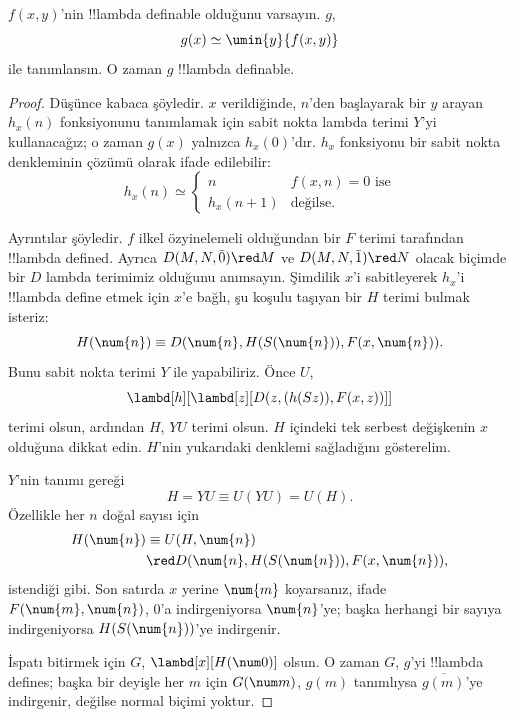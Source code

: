 


\begin{lem}
$f(x,y)$'nin !!{lambda definable} olduğunu varsayın. $g$,
\[
g(x) \simeq \umin{y}{f(x,y)}
\]
ile tanımlansın. O zaman $g$ !!{lambda definable}.
\end{lem}

\begin{proof}
Düşünce kabaca şöyledir. $x$ verildiğinde, $n$'den başlayarak bir $y$ arayan
$h_x(n)$ fonksiyonunu tanımlamak için sabit nokta lambda terimi $Y$'yi
kullanacağız; o zaman $g(x)$ yalnızca $h_x(0)$'dır. $h_x$ fonksiyonu bir
sabit nokta denkleminin çözümü olarak ifade edilebilir:
\[
h_x(n) \simeq
\begin{cases}
n & \text{$f(x,n) = 0$ ise} \\
h_x(n+1) & \text{değilse.}
\end{cases}
\]

Ayrıntılar şöyledir. $f$ ilkel özyinelemeli olduğundan bir $F$ terimi
tarafından !!{lambda defined}. Ayrıca $D(M,N,\bar{0})\red M$ ve
$D(M,N,\bar{1})\red N$ olacak biçimde bir $D$ lambda terimimiz olduğunu
anımsayın. Şimdilik $x$'i sabitleyerek $h_x$'i !!{lambda define} etmek için
$x$'e bağlı, şu koşulu taşıyan bir $H$ terimi bulmak isteriz:
\[
H(\num{n}) \equiv D(\num{n}, H(S(\num{n})), F(x, \num{n})).
\]
Bunu sabit nokta terimi $Y$ ile yapabiliriz. Önce $U$,
\[
\lambd[h][\lambd[z][D(z,(h(Sz)),F(x,z))]]
\]
terimi olsun, ardından $H$, $YU$ terimi olsun. $H$ içindeki tek serbest
değişkenin $x$ olduğuna dikkat edin. $H$'nin yukarıdaki denklemi sağladığını
gösterelim.

$Y$'nin tanımı gereği
\[
H = YU \equiv U(YU) = U(H).
\]
Özellikle her $n$ doğal sayısı için
\begin{align*}
H(\num{n}) & \equiv U(H, \num{n}) \\
& \red D(\num{n}, H(S(\num{n})), F(x, \num{n})),
\end{align*}
istendiği gibi. Son satırda $x$ yerine $\num{m}$ koyarsanız, ifade
$F(\num{m},\num{n})$, $\num{0}$'a indirgeniyorsa $\num{n}$'ye; başka
herhangi bir sayıya indirgeniyorsa $H(S(\num{n}))$'ye indirgenir.

İspatı bitirmek için $G$, $\lambd[x][H(\num 0)]$ olsun. O zaman $G$, $g$'yi
!!{lambda define}s; başka bir deyişle her $m$ için $G(\num m)$, $g(m)$
tanımlıysa $\overline{g(m)}$'ye indirgenir, değilse normal biçimi yoktur.
\end{proof}

